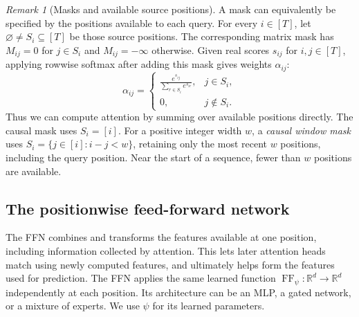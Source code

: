 \documentclass[11pt,twoside]{article}
\newcommand{\R}{\mathbb R}
\theoremstyle{plain}
\theoremstyle{definition}
\theoremstyle{remark}
\newtheorem{remark}{Remark}[section]
\begin{document}
\begin{remark}[Masks and available source positions]
\label{rem:available-positions}
A mask can equivalently be specified by the positions available to each query.
For every $i\in[T]$, let $\varnothing\ne S_i\subseteq[T]$ be those source
positions. The corresponding matrix mask has $M_{ij}=0$ for $j\in S_i$
and $M_{ij}=-\infty$ otherwise. Given real scores $s_{ij}$ for
$i,j\in[T]$, applying rowwise softmax after adding this mask gives weights $\alpha_{ij}$:
\begin{equation}
\alpha_{ij}=\begin{cases}
\displaystyle\frac{e^{s_{ij}}}{\sum_{r\in S_i}e^{s_{ir}}},&j\in S_i,\\[2mm]
0,&j\notin S_i.
\end{cases}
\label{eq:available-position-attention}
\end{equation}
Thus we can compute attention by summing over available positions directly.
The causal mask uses $S_i=[i]$. For a positive integer width $w$, a
\emph{causal window mask} uses $S_i=\{j\in[i]:i-j<w\}$, retaining only the
most recent $w$ positions, including the query position. Near the start of a
sequence, fewer than $w$ positions are available.
\end{remark}

\subsection{The positionwise feed-forward network}
\label{sec:positionwise-ffn}

The FFN combines and transforms the features available at one position,
including information collected by attention. This lets later attention
heads match using newly computed features, and ultimately helps form the
features used for prediction.
The FFN applies the same learned function $\operatorname{FF}_\psi:\R^d\to\R^d$
independently at each position. Its architecture can be an MLP, a gated
network, or a mixture of experts. We use $\psi$ for its learned parameters.
\end{document}
